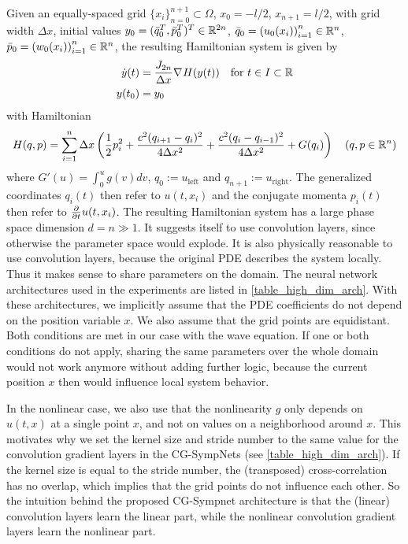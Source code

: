 \documentclass[twoside,a4paper]{article}
\begin{document}
Given an equally-spaced grid $\{ x_i \}_{n=0}^{n+1} \subset \Omega$, $x_0 = -l/2$, $x_{n+1} = l/2$,
with grid width $\Delta x$,
initial values $y_0 = (\bar{q}_0^T, \bar{p}_0^T)^T \in \mathbb{R}^{2n}$, $\bar{q}_0 = \left( u_0(x_i) \right)_{i=1}^n \in \mathbb{R}^n$, 
$\bar{p}_0 = \left( w_0(x_i) \right)_{i=1}^n \in \mathbb{R}^n$,
the resulting Hamiltonian system is given by
\begin{align*}
	\dot{y}(t) &= \frac{J_{2n}}{\Delta x} \nabla_{}{H}(y(t)) \quad \text{for } t \in I \subset \mathbb{R} \\
	y(t_0) &= y_0
\end{align*}
with Hamiltonian
\begin{equation*}
	H(q,p) = \sum_{i=1}^n \Delta x \left( 
	\frac{1}{2} p_i^2 + \frac{c^2 (q_{i+1} - q_i)^2}{4 \Delta x^2} 
	+ \frac{c^2 (q_i - q_{i-1})^2}{4 \Delta x^2} + G(q_i)
	\right)
	\quad (q,p \in \mathbb{R}^n)
\end{equation*}
where $G'(u) = \int_0^u g(v) dv$, $q_0 := u_{\text{left}}$ and $q_{n+1} := u_{\text{right}}$.
The generalized coordinates $q_i(t)$ then refer to $u(t,x_i)$ and 
the conjugate momenta $p_i(t)$ then refer to $\frac{\partial }{\partial t} u(t,x_i)$.
The resulting Hamiltonian system has a large phase space dimension $d=n \gg 1$.
It suggests itself to use convolution layers, since otherwise
the parameter space would explode. It is also physically reasonable
to use convolution layers, because the original PDE describes the system locally.
Thus it makes sense to share parameters on the domain.
The neural network architectures used in the experiments
are listed in \cref{table_high_dim_arch}. With these architectures,
we implicitly assume that the PDE coefficients do not depend on the position variable $x$.
We also assume that the grid points are equidistant. Both conditions are met
in our case with the wave equation. If one or both conditions do not apply, sharing the same
parameters over the whole domain would not work anymore without 
adding further logic, because the current position $x$ then would influence
local system behavior.

In the nonlinear case, we also use that the nonlinearity $g$ 
only depends on $u(t,x)$ at a single point $x$, and not
on values on a neighborhood around $x$. 
This motivates why we set the kernel size and stride number
to the same value for the convolution gradient layers in 
the CG-SympNets (see \cref{table_high_dim_arch}).
If the kernel size is equal to the stride number, the (transposed) cross-correlation
has no overlap, which implies that the grid points do not influence each other.
So the intuition behind the 
proposed CG-Sympnet architecture is that the (linear) convolution layers learn the
linear part, while the nonlinear convolution gradient layers learn the nonlinear part.
\end{document}
